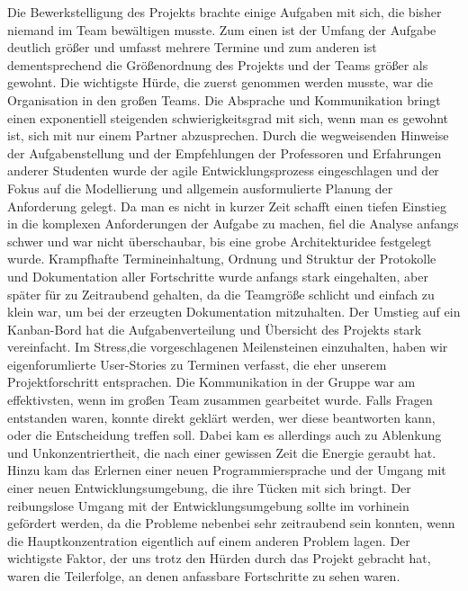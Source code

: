 \documentclass[
   draft=false
  ,paper=a4
  ,twoside=true
  ,fontsize=11pt
  ,headsepline
  ,DIV11
  ,parskip=full+
]{scrartcl} %
\begin{document}
Die Bewerkstelligung des Projekts brachte einige Aufgaben mit sich, die bisher niemand im Team bewältigen musste. Zum einen ist der Umfang der Aufgabe deutlich größer und umfasst mehrere Termine und zum anderen ist dementsprechend die Größenordnung des Projekts und der Teams größer als gewohnt.\newline
Die wichtigste Hürde, die zuerst genommen werden musste, war die Organisation in den großen Teams. Die Absprache und Kommunikation bringt einen exponentiell steigenden schwierigkeitsgrad mit sich, wenn man es gewohnt ist, sich mit nur einem Partner abzusprechen.
\newline
Durch die wegweisenden Hinweise der Aufgabenstellung und der Empfehlungen der Professoren und Erfahrungen anderer Studenten wurde der agile Entwicklungsprozess eingeschlagen und der Fokus auf die Modellierung und allgemein ausformulierte Planung der Anforderung gelegt. 
\newline
Da man es nicht in kurzer Zeit schafft einen tiefen Einstieg in die komplexen Anforderungen der Aufgabe zu machen, fiel die Analyse anfangs schwer und war nicht überschaubar, bis eine grobe Architekturidee festgelegt wurde. \newline Krampfhafte Termineinhaltung, Ordnung und Struktur der Protokolle und Dokumentation aller Fortschritte wurde anfangs stark eingehalten, aber später für zu Zeitraubend gehalten, da die Teamgröße schlicht und einfach zu klein war, um bei der erzeugten Dokumentation mitzuhalten. Der Umstieg auf ein Kanban-Bord hat die Aufgabenverteilung und Übersicht des Projekts stark vereinfacht.\newline
Im Stress,die vorgeschlagenen Meilensteinen einzuhalten, haben wir eigenforumlierte User-Stories zu Terminen verfasst, die eher unserem Projektforschritt entsprachen. 
\newline
Die Kommunikation in der Gruppe war am effektivsten, wenn im großen Team zusammen gearbeitet wurde. Falls Fragen entstanden waren, konnte direkt geklärt werden, wer diese beantworten kann, oder die Entscheidung treffen soll. Dabei kam es allerdings auch zu Ablenkung und Unkonzentriertheit, die nach einer gewissen Zeit die Energie geraubt hat. 
Hinzu kam das Erlernen einer neuen Programmiersprache und der Umgang mit einer neuen Entwicklungsumgebung, die ihre Tücken mit sich bringt. Der reibungslose Umgang mit der Entwicklungsumgebung sollte im vorhinein gefördert werden, da die Probleme nebenbei sehr zeitraubend sein konnten, wenn die Hauptkonzentration eigentlich auf einem anderen Problem lagen. 
Der wichtigste Faktor, der uns trotz den Hürden durch das Projekt gebracht hat, waren die Teilerfolge, an denen anfassbare Fortschritte zu sehen waren.
\newpage
\end{document}
